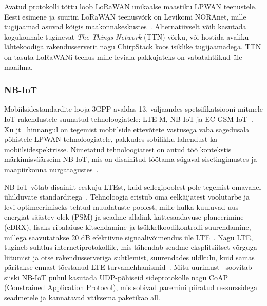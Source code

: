 \documentclass[12pt]{article}
\begin{document}
    Avatud protokolli tõttu loob LoRaWAN unikaalse maastiku LPWAN teenustele.
    Eesti esimene ja suurim LoRaWAN teenusvõrk on Levikomi NORAnet, mille tugijaamad asuvad kõigis maakonnakeskustes~\cite{noranetuudis}.
    Alternatiivselt võib kasutada kogukonnale tuginevat \textit{The Things Network} (TTN) võrku, või hostida avaliku lähtekoodiga rakendusserverit nagu ChirpStack koos isiklike tugijaamadega.
    TTN on tasuta LoRaWANi teenus mille leviala pakkujateks on vabatahtlikud üle maailma.

    \subsubsection{NB-IoT}

    Mobiilsidestandardite looja 3GPP avaldas 13. väljaandes spetsifikatsiooni mitmele IoT rakendustele suunatud tehnoloogiatele: LTE-M, NB-IoT ja EC-GSM-IoT~\cite{3gppiot}.
    Xu jt~\cite{xuyao} hinnangul on tegemist mobiilside ettevõtete vastusega vaba sagedusala põhistele LPWAN tehnoloogiatele, pakkudes sobilikku lahendust ka mobiilsidespektrisse.
    Nimetatud tehnoloogiatest on antud töö kontekstis märkimisväärseim NB-IoT, mis on disainitud töötama sügaval sisetingimustes ja maapiirkonna nurgatagustes~\cite{martinez}.

    NB-IoT võtab disainilt eeskuju LTEst, kuid sellegipoolest pole tegemist omavahel ühilduvate standarditega~\cite{wanglin}.
    Tehnoloogia eristub oma eelkäijatest voolutarbe ja levi optimeerimiseks tehtud muudatuste poolest, mille hulka kuuluvad uus energiat säästev olek (PSM) ja seadme allalink kättesaadavuse planeerimine (eDRX), lisaks ribalaiuse kitsendamine ja tsükkelkoodikontrolli suurendamine, millega saavutatakse 20 dB efektiivne signaalivõimendus üle LTE~\cite{xuyao}.
    Nagu LTE, tugineb suhtlus internetiprotokollile, mis tähendab seadme eksplitsiitset võrguga liitumist ja otse rakendusserveriga suhtlemist, suurendades üldkulu, kuid samas päritakse ennast tõestanud LTE turvamehhanismid~\cite{basu}.
    Mitu uurimust~\cite{wirges, larmo} soovitab siiski NB-IoT puhul kasutada UDP-põhiseid sideprotokolle nagu CoAP (Constrained Application Protocol), mis sobivad paremini piiratud ressurssidega seadmetele ja kannatavad väiksema paketikao all.
\end{document}

